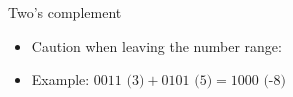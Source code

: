 \documentclass[11pt,compress,t,notes=noshow, xcolor=table]{beamer}
\begin{document}
\begin{vbframe}{Two's complement}
\vspace{-0.5cm}

\begin{itemize}
\item Caution when leaving the number range:
\item Example: $0011 \text{ (3)} + 0101 \text{ (5)} = 1000 \text{ (-8)}$
\end{itemize}




%
%
%

%

%
%

%


\end{vbframe}
\end{document}

